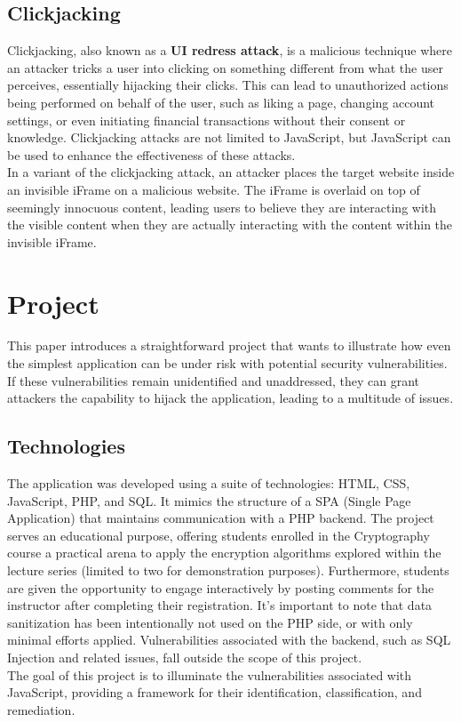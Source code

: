 \documentclass{article}
\begin{document}
\subsection{Clickjacking}
Clickjacking, also known as a \textbf{UI redress attack}, is a malicious technique where an attacker tricks a user into clicking on something different from what the user perceives, essentially hijacking their clicks. This can lead to unauthorized actions being performed on behalf of the user, such as liking a page, changing account settings, or even initiating financial transactions without their consent or knowledge. Clickjacking attacks are not limited to JavaScript, but JavaScript can be used to enhance the effectiveness of these attacks.
\\
In a variant of the clickjacking attack, an attacker places the target website inside an invisible iFrame on a malicious website. The iFrame is overlaid on top of seemingly innocuous content, leading users to believe they are interacting with the visible content when they are actually interacting with the content within the invisible iFrame.

\newpage
\maketitle
\section{Project}
This paper introduces a straightforward project that wants to illustrate how even the simplest application can be under risk with potential security vulnerabilities. If these vulnerabilities remain unidentified and unaddressed, they can grant attackers the capability to hijack the application, leading to a multitude of issues.

\subsection{Technologies}
The application was developed using a suite of technologies: HTML, CSS, JavaScript, PHP, and SQL. It mimics the structure of a SPA (Single Page Application) that maintains communication with a PHP backend. The project serves an educational purpose, offering students enrolled in the Cryptography course a practical arena to apply the encryption algorithms explored within the lecture series (limited to two for demonstration purposes). Furthermore, students are given the opportunity to engage interactively by posting comments for the instructor after completing their registration. It's important to note that data sanitization has been intentionally not used on the PHP side, or with only minimal efforts applied. Vulnerabilities associated with the backend, such as SQL Injection and related issues, fall outside the scope of this project.
\\
The goal of this project is to illuminate the vulnerabilities associated with JavaScript, providing a framework for their identification, classification, and remediation.
\end{document}
